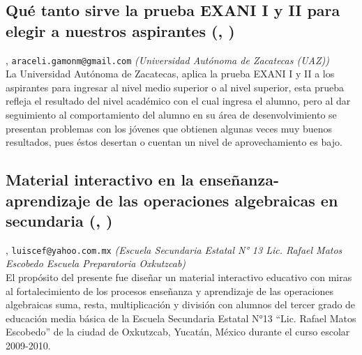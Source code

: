 \subsection{\sffamily Qué tanto sirve la prueba EXANI I y II para elegir a nuestros aspirantes {\footnotesize (, )}} \label{reg-1176} 
, {\tt araceli.gamonm@gmail.com}  {\slshape (Universidad Autónoma de Zacatecas (UAZ))}\\
          \noindent  La Universidad Autónoma de Zacatecas, aplica la prueba EXANI I y II a los aspirantes para ingresar al nivel medio superior o al nivel superior, esta prueba refleja el resultado del nivel académico con el cual ingresa el alumno, pero al dar seguimiento al comportamiento del alumno en su área de desenvolvimiento se presentan problemas con los jóvenes que obtienen algunas veces muy buenos resultados, pues éstos desertan o cuentan un nivel de aprovechamiento es bajo.  
\subsection{\sffamily Material interactivo en la enseñanza-aprendizaje de las operaciones algebraicas en secundaria {\footnotesize (, )}} \label{reg-518} 
, {\tt luiscef@yahoo.com.mx}  {\slshape (Escuela Secundaria Estatal N° 13 Lic. Rafael Matos Escobedo Escuela Preparatoria Oxkutzcab)}\\
          \noindent El propósito del presente fue diseñar un material interactivo educativo con miras al fortalecimiento de los procesos enseñanza y aprendizaje de las operaciones algebraicas suma, resta, multiplicación y división con alumnos del tercer grado de educación media básica de la Escuela Secundaria Estatal N°13 “Lic. Rafael Matos Escobedo” de la ciudad de Oxkutzcab, Yucatán, México durante el curso escolar 2009-2010.
